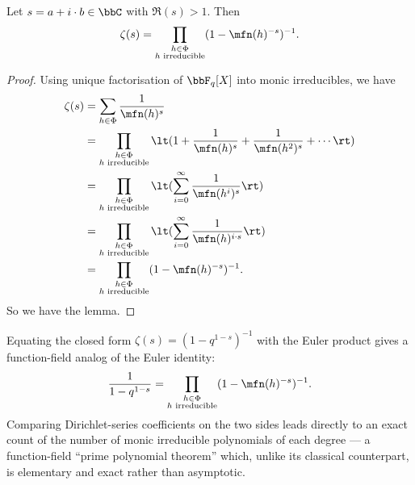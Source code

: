 \begin{lemma}{}{}
  Let $s=a+i\cdot b\in\bbC$ with $\Re(s)>1$. Then $$\zeta(s)=\prod_{\substack{h\in\Phi\\ h\text{ irreducible}}}(1-\mfn(h)^{-s})^{-1}.$$
\end{lemma}
\begin{proof}
  Using unique factorisation of $\bbF_q[X]$ into monic irreducibles, we have
  \begin{align*}
    \zeta(s) & = \sum_{h\in\Phi}\frac{1}{\mfn(h)^s}\\
    & = \prod_{\substack{h\in \Phi\\ h\text{ irreducible}}} \lt(1+\frac1{\mfn(h)^s}+\frac{1}{\mfn(h^2)^s}+\cdots\rt)\\
    & = \prod_{\substack{h\in \Phi\\ h\text{ irreducible}}}\lt(\sum_{i=0}^{\infty}\frac{1}{\mfn(h^i)^s}\rt)\\
    & = \prod_{\substack{h\in \Phi\\ h\text{ irreducible}}}\lt(\sum_{i=0}^{\infty}\frac{1}{\mfn(h)^{i\cdot s}}\rt)\\
    & = \prod_{\substack{h\in \Phi\\ h\text{ irreducible}}} (1-\mfn(h)^{-s})^{-1}.
  \end{align*}
  So we have the lemma.
\end{proof}

Equating the closed form $\zeta(s)=(1-q^{1-s})^{-1}$ with the Euler product gives a function-field analog of the Euler identity:
$$\frac{1}{1-q^{1-s}}=\prod_{\substack{h\in\Phi\\ h\text{ irreducible}}}(1-\mfn(h)^{-s})^{-1}.$$
Comparing Dirichlet-series coefficients on the two sides leads directly to an exact count of the number of monic irreducible polynomials of each degree --- a function-field ``prime polynomial theorem'' which, unlike its classical counterpart, is elementary and exact rather than asymptotic.

